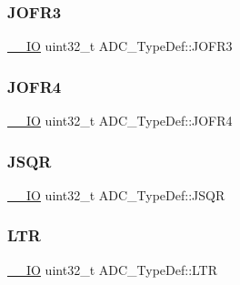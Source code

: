 \mbox{\label{struct_a_d_c___type_def_ae9c78142f6edf8122384263878d09015}} 
\subsubsection{\texorpdfstring{JOFR3}{JOFR3}}
{\footnotesize\ttfamily \mbox{\hyperlink{group___c_m_s_i_s___c_m3__core__definitions_gaec43007d9998a0a0e01faede4133d6be}{\+\_\+\+\_\+\+IO}} uint32\+\_\+t A\+D\+C\+\_\+\+Type\+Def\+::\+J\+O\+F\+R3}

\mbox{\label{struct_a_d_c___type_def_a92f5c1a5aaa8b286317f923482e09d35}} 
\subsubsection{\texorpdfstring{JOFR4}{JOFR4}}
{\footnotesize\ttfamily \mbox{\hyperlink{group___c_m_s_i_s___c_m3__core__definitions_gaec43007d9998a0a0e01faede4133d6be}{\+\_\+\+\_\+\+IO}} uint32\+\_\+t A\+D\+C\+\_\+\+Type\+Def\+::\+J\+O\+F\+R4}

\mbox{\label{struct_a_d_c___type_def_a5438a76a93ac1bd2526e92ef298dc193}} 
\subsubsection{\texorpdfstring{JSQR}{JSQR}}
{\footnotesize\ttfamily \mbox{\hyperlink{group___c_m_s_i_s___c_m3__core__definitions_gaec43007d9998a0a0e01faede4133d6be}{\+\_\+\+\_\+\+IO}} uint32\+\_\+t A\+D\+C\+\_\+\+Type\+Def\+::\+J\+S\+QR}

\mbox{\label{struct_a_d_c___type_def_afdaf8050fb01739206a92c9ad610f396}} 
\subsubsection{\texorpdfstring{LTR}{LTR}}
{\footnotesize\ttfamily \mbox{\hyperlink{group___c_m_s_i_s___c_m3__core__definitions_gaec43007d9998a0a0e01faede4133d6be}{\+\_\+\+\_\+\+IO}} uint32\+\_\+t A\+D\+C\+\_\+\+Type\+Def\+::\+L\+TR}

